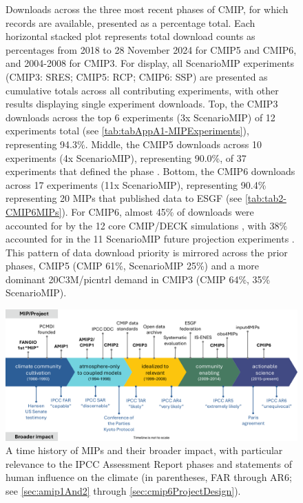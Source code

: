\documentclass[manuscript]{copernicus}
\def\cred#1{{\color{red}#1}}
\begin{document}
\begin{figure}
    \centering
    
    \caption{Downloads across the three most recent phases of CMIP, for which records are available, presented as a percentage total. Each horizontal stacked plot represents total download counts as percentages from 2018 to 28 November 2024 for CMIP5 and CMIP6, and 2004-2008 for CMIP3. For display, all ScenarioMIP experiments (CMIP3: SRES; CMIP5: RCP; CMIP6: SSP) are presented as cumulative totals across all contributing experiments, with other results displaying single experiment downloads. Top, the CMIP3 \citep{meehl_wcrp_2007} downloads across the top 6 experiments (3x ScenarioMIP) of 12 experiments total (see \autoref{tab:tabAppA1-MIPExperiments}), representing 94.3\%. Middle, the CMIP5 downloads across 10 experiments (4x ScenarioMIP), representing 90.0\%, of 37 experiments that defined the phase \citep[representing 8 MIPs identified in \autoref{tab:tabAppA1-MIPExperiments};][]{taylor_overview_2012}. Bottom, the CMIP6 downloads across 17 experiments (11x ScenarioMIP), representing 90.4\% representing 20 MIPs that published data to ESGF (see \autoref{tab:tab2-CMIP6MIPs}). For CMIP6, almost 45\% of downloads were accounted for by the 12 core CMIP/DECK simulations \citep{eyring_overview_2016}, with 38\% accounted for in the 11 ScenarioMIP future projection experiments \citep{oneill_scenario_2016}. This pattern of data download priority is mirrored across the prior phases, CMIP5 (CMIP 61\%, ScenarioMIP 25\%) and a more dominant 20C3M/picntrl demand in CMIP3 (CMIP 64\%, 35\% ScenarioMIP).}
    \label{fig:fig5-MIPDownloads}
\end{figure}


\begin{figure}
    \centering
    \includegraphics[width=\textwidth]{241126T171500_Fig6.pdf}
    \caption{A time history of MIPs and their broader impact, with particular relevance to the IPCC Assessment Report phases and statements of human influence on the climate (in parentheses, FAR through AR6; see \autoref{sec:amip1And2} through \autoref{sec:cmip6ProjectDesign}).}
    \label{fig:fig6-MIPImpact}
\end{figure}
\end{document}
